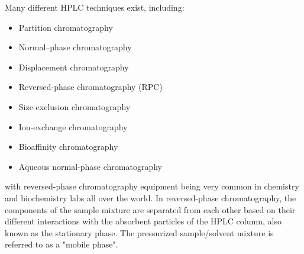 Many different HPLC techniques exist, including:
\begin{itemize}
    \item Partition chromatography
    \item Normal–phase chromatography
    \item Displacement chromatography
    \item Reversed-phase chromatography (RPC)
    \item Size-exclusion chromatography
    \item Ion-exchange chromatography
    \item Bioaffinity chromatography
    \item Aqueous normal-phase chromatography
\end{itemize}
with reversed-phase chromatography equipment being very common in chemistry and biochemistry labs all over the world. In reversed-phase chromatography, the components of the sample mixture are separated from each other based on their different interactions with the absorbent particles of the HPLC column, also known as the stationary phase. The pressurized sample/solvent mixture is referred to as a "mobile phase".

